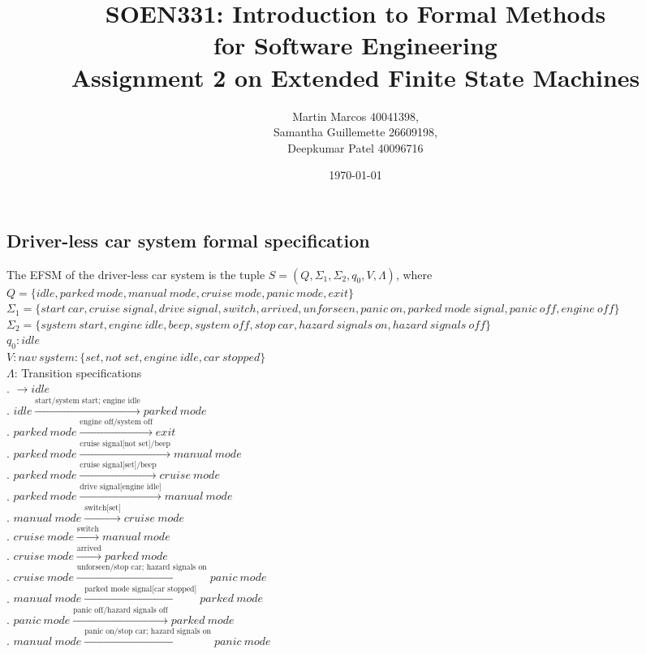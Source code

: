 \documentclass[12pt]{article}
\title{SOEN331: Introduction to Formal Methods\\for Software Engineering\\
Assignment 2 on Extended Finite State Machines}
\author{Martin Marcos 40041398,\\ Samantha Guillemette 26609198,\\ Deepkumar Patel 40096716  }
\date{\today}
\begin{document}
\begin{spacing}{1.5}

\maketitle

\newpage


\section{Driver-less car system formal specification}

\noindent The EFSM of the driver-less car system is the tuple $S = (Q, \Sigma_1, \Sigma_2, q_0, V, \Lambda)$, where\\

\noindent $Q = \{idle, parked~mode, manual~mode, cruise~mode, panic~mode, exit\}$\\

\noindent $\Sigma_1 = \{start~car, cruise~signal, drive~signal, switch, arrived, unforseen,panic~on,parked~mode~signal, panic~off, engine~off\}$\\
\noindent $\Sigma_2 = \{system~start, engine~idle, beep, system~off, stop~car, hazard~signals~on, hazard~signals~off\}$\\
\noindent $q_0: idle$\\
\noindent $V: nav~system: \{set, not~set, engine~idle, car~stopped\}$\\
\noindent $\Lambda$: Transition specifications\\
. $\rightarrow idle$\\
. $idle \xrightarrow {\text {start/system start; engine idle}} parked~mode$\\
. $parked~mode  \xrightarrow {\text {engine off/system off}} exit$\\
. $parked~mode  \xrightarrow {\text {cruise signal[not set]/beep}} manual~mode$\\
. $parked~mode  \xrightarrow {\text {cruise signal[set]/beep}} cruise~mode$\\
. $parked~mode  \xrightarrow {\text {drive signal[engine idle]}} manual~mode$\\
. $manual~mode  \xrightarrow {\text {switch[set]}} cruise~mode$\\
. $cruise~mode  \xrightarrow {\text {switch}} manual~mode$\\
. $cruise~mode  \xrightarrow {\text {arrived}} parked~mode$\\
. $cruise~mode  \xrightarrow {\text {unforseen/stop car; hazard signals on}} panic~mode$\\
. $manual~mode  \xrightarrow {\text {parked mode signal[car stopped]}} parked~mode$\\
. $panic~mode  \xrightarrow {\text {panic off/hazard signals off}} parked~mode$\\
. $manual~mode  \xrightarrow {\text {panic~on/stop car; hazard signals on}} panic~mode$\\


\end{spacing}
\end{document}
